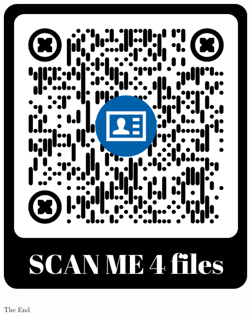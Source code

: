\documentclass{beamer}
\begin{document}
\begin{frame}
\begin{columns}[c]
\includegraphics[width=\linewidth]{QR_Files}
\end{columns}
\end{frame}


\begin{frame}
\Huge{\centerline{The End}}
\end{frame}

\end{document}
